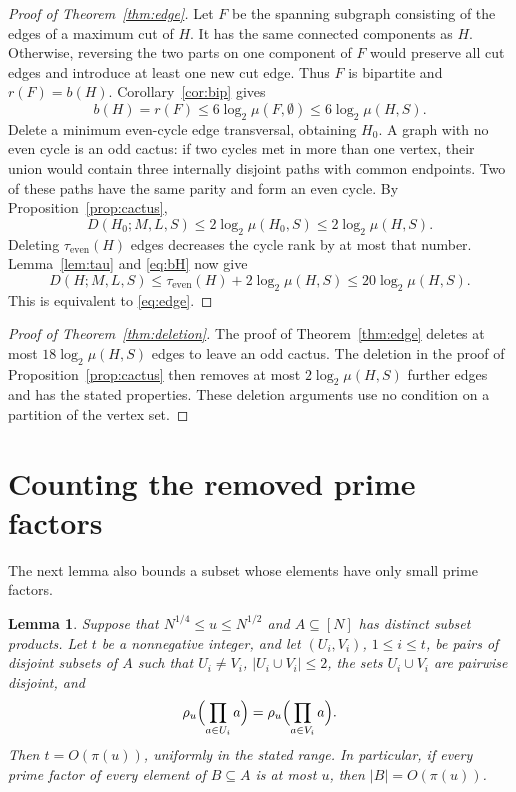 \documentclass[11pt]{article}
\numberwithin{equation}{section}
\newtheorem{lemma}[theorem]{Lemma}
\theoremstyle{remark}
\begin{document}
\begin{proof}[Proof of Theorem~\ref{thm:edge}]
Let $F$ be the spanning subgraph consisting of the edges of a maximum cut of $H$. It has the same connected components as $H$. Otherwise, reversing the two parts on one component of $F$ would preserve all cut edges and introduce at least one new cut edge. Thus $F$ is bipartite and $r(F)=b(H)$. Corollary~\ref{cor:bip} gives
\begin{equation}\label{eq:bH}
b(H)=r(F)\le6\log_2\mu(F,\emptyset)\le6\log_2\mu(H,S).
\end{equation}
Delete a minimum even-cycle edge transversal, obtaining $H_0$. A graph with no even cycle is an odd cactus: if two cycles met in more than one vertex, their union would contain three internally disjoint paths with common endpoints. Two of these paths have the same parity and form an even cycle. By Proposition~\ref{prop:cactus},
\[
D(H_0;M,L,S)\le2\log_2\mu(H_0,S)\le2\log_2\mu(H,S).
\]
Deleting $\tau_{\mathrm{even}}(H)$ edges decreases the cycle rank by at most that number. Lemma~\ref{lem:tau} and \eqref{eq:bH} now give
\[
D(H;M,L,S)\le\tau_{\mathrm{even}}(H)+2\log_2\mu(H,S)\le20\log_2\mu(H,S).
\]
This is equivalent to \eqref{eq:edge}.
\end{proof}

\begin{proof}[Proof of Theorem~\ref{thm:deletion}]
The proof of Theorem~\ref{thm:edge} deletes at most $18\log_2\mu(H,S)$ edges to leave an odd cactus. The deletion in the proof of Proposition~\ref{prop:cactus} then removes at most $2\log_2\mu(H,S)$ further edges and has the stated properties. These deletion arguments use no condition on a partition of the vertex set.
\end{proof}

\section{Counting the removed prime factors}\label{sec:cofactor}
The next lemma also bounds a subset whose elements have only small prime factors.

\begin{lemma}\label{lem:pairs}
Suppose that $N^{1/4}\le u\le N^{1/2}$ and $A\subseteq[N]$ has distinct subset products. Let $t$ be a nonnegative integer, and let $(U_i,V_i)$, $1\le i\le t$, be pairs of disjoint subsets of $A$ such that $U_i\ne V_i$, $|U_i\cup V_i|\le2$, the sets $U_i\cup V_i$ are pairwise disjoint, and
\[
\rho_u\Bigl(\prod_{a\in U_i}a\Bigr)=\rho_u\Bigl(\prod_{a\in V_i}a\Bigr).
\]
Then $t=O(\pi(u))$, uniformly in the stated range. In particular, if every prime factor of every element of $B\subseteq A$ is at most $u$, then $|B|=O(\pi(u))$.
\end{lemma}
\end{document}
